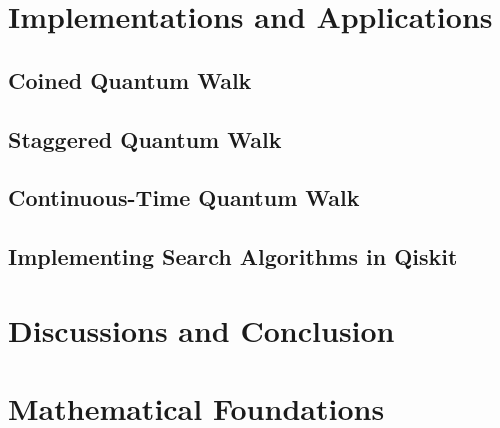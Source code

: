 \documentclass[
oneside,
11pt, a4paper,
footinclude=true,
headinclude=true,
cleardoublepage=empty
]{scrbook}
\begin{document}
\chapter{Implementations and Applications}\label{chap:qiskitImplementation}

\section{Coined Quantum Walk}\label{sec:CoinedQiskit}

\section{Staggered Quantum Walk}\label{sec:StagQiskit}

\section{Continuous-Time Quantum Walk}\label{sec:ContQiskit}

\section{Implementing Search Algorithms in Qiskit}\label{sec:SearchProblemsQiskit}


\chapter{Discussions and Conclusion}








\chapter{Mathematical Foundations}
\end{document}
